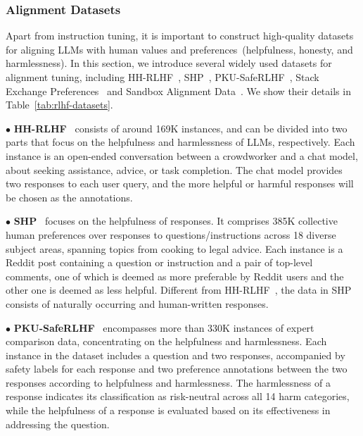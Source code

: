 {{{{\subsubsection{Alignment Datasets}
\label{sec:commonly_used_aligntuning}

Apart from instruction tuning, it is important to construct high-quality datasets for aligning LLMs with   human values and preferences~(\eg helpfulness, honesty, and harmlessness). In this section, we introduce several widely used datasets for alignment tuning, including  HH-RLHF~\cite{Bai-arxiv-2022-Training}, SHP~\cite{Ethayarajh-ICLM-2022-Understanding}, PKU-SafeRLHF~\cite{Dai-arxiv-2023-SafeRLHF}, Stack Exchange Preferences~\cite{Lambert-2023-StackH4} and Sandbox Alignment Data~\cite{Liu-arxiv-2023-training}. We show their details in Table~\ref{tab:rlhf-datasets}.


$\bullet$  \textbf{HH-RLHF}~\cite{Bai-arxiv-2022-Training} consists of around 169K instances, and can be divided into two parts that focus on the helpfulness and harmlessness of LLMs, respectively.
Each instance is an open-ended conversation between a crowdworker and a chat model, about seeking assistance, advice, or task completion.
The chat model provides two responses  to each user query, and the more helpful or harmful responses will be chosen as the annotations.


$\bullet$  {\textbf{SHP}}{~\cite{Ethayarajh-ICLM-2022-Understanding} focuses on the helpfulness of responses. It comprises 385K collective human preferences over responses to questions/instructions across 18 diverse subject areas, spanning topics from cooking to legal advice. Each instance is a Reddit post containing a question or instruction and a pair of top-level comments, one of which is deemed as more preferable by Reddit users and the other one is deemed as less helpful. 
Different from HH-RLHF~\cite{Bai-arxiv-2022-Training}, the data in SHP consists of naturally occurring and human-written responses.
 }

$\bullet$  {\textbf{PKU-SafeRLHF}}{~\cite{Dai-arxiv-2023-SafeRLHF} encompasses more than 330K instances of expert comparison data, concentrating on the helpfulness and harmlessness. Each instance in the dataset includes a question and two responses, accompanied by safety labels for each response and two preference annotations between the two responses according to helpfulness and harmlessness.
The harmlessness of a response indicates its classification as risk-neutral across all 14 harm categories, while the helpfulness of a response is evaluated based on its effectiveness in addressing the question. 
 }

}}}}
